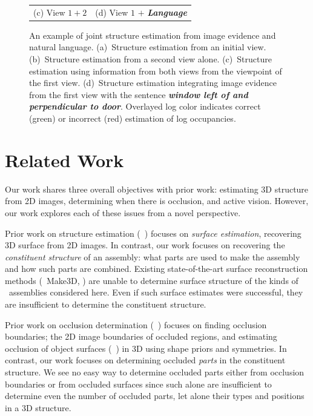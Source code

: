 \begin{figure}
\begin{tabular}{@{}c@{\hspace*{2pt}}c@{}}
    (c) View $1 + 2$ & (d) View $1$ $+$ \emph{\textbf{Language}}
  \end{tabular}
  \caption{\small An example of joint structure estimation from image evidence
    and natural language.
    (a)~Structure estimation from an initial view.
    (b)~Structure estimation from a second view alone.
    (c)~Structure estimation using information from both views from the viewpoint of the first view.
    (d)~Structure estimation integrating image evidence from the first view
    with the sentence \emph{\textbf{window left of and perpendicular to door}}.
    Overlayed log color indicates correct (green) or incorrect (red) estimation
    of log occupancies.}
  \label{fig:language}
  \par\vspace*{-3ex}
\end{figure}

\par\vspace{-1ex}
\section{Related Work}
\label{sec:related}

Our work shares three overall objectives with prior work:
estimating 3D structure from 2D images, determining when there is
occlusion, and active vision.
%
However, our work explores each of these issues from a novel perspective.

Prior work on structure estimation (\eg\ )
focuses on \emph{surface estimation}, recovering 3D surface from 2D images.
%
In contrast, our work focuses on recovering the \emph{constituent structure}
of an assembly: what parts are used to make the assembly and how such parts are
combined.
%
Existing state-of-the-art surface reconstruction methods (\eg\ Make3D,
 ) are unable to determine surface structure of the kinds of
\LincolnLog\ assemblies considered here.
%
Even if such surface estimates were successful, they are insufficient to
determine the constituent structure.

Prior work on occlusion determination (\eg\ )
focuses on finding occlusion boundaries; the 2D image boundaries of occluded
regions, and estimating occlusion of object surfaces (\eg\
) in $3$D using shape priors and symmetries.
%
In contrast, our work focuses on determining occluded \emph{parts} in the
constituent structure.
%
We see no easy way to determine occluded parts either from occlusion boundaries
or from occluded surfaces since such alone are insufficient to determine even
the number of occluded parts, let alone their types and positions in a 3D
structure.

